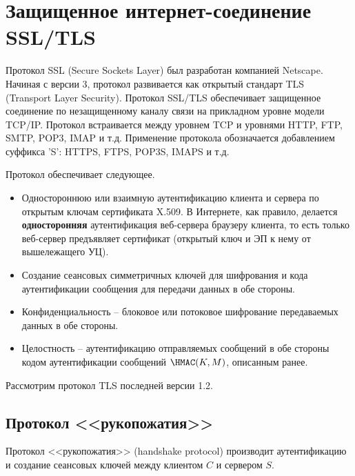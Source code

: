 \section{Защищенное интернет-соединение SSL/TLS}

Протокол SSL (Secure Sockets Layer) был разработан компанией Netscape. Начиная с версии 3, протокол развивается как открытый стандарт TLS (Transport Layer Security). Протокол SSL/TLS обеспечивает защищенное соединение по незащищенному каналу связи на прикладном уровне модели TCP/IP. Протокол встраивается между уровнем TCP и уровнями HTTP, FTP, SMTP, POP3, IMAP и т.д. Применение протокола обозначается добавлением суффикса 'S': HTTPS, FTPS, POP3S, IMAPS и т.д.

Протокол обеспечивает следующее.
\begin{itemize}
    \item Одностороннюю или взаимную аутентификацию клиента и сервера по открытым ключам сертификата X.509. В Интернете, как правило, делается \textbf{односторонняя} аутентификация веб-сервера браузеру клиента, то есть только веб-сервер предъявляет сертификат (открытый ключ и ЭП к нему от вышележащего УЦ).
    \item Создание сеансовых симметричных ключей для шифрования и кода аутентификации сообщения для передачи данных в обе стороны.
    \item Конфиденциальность -- блоковое или потоковое шифрование передаваемых данных в обе стороны.
    \item Целостность -- аутентификацию отправляемых сообщений в обе стороны кодом аутентификации сообщений $\HMAC(K,M)$, описанным ранее.
\end{itemize}

Рассмотрим протокол TLS последней версии 1.2.


\subsection{Протокол <<рукопожатия>>}

Протокол <<рукопожатия>> (handshake protocol) производит аутентификацию и создание сеансовых ключей между клиентом $C$ и сервером $S$.

